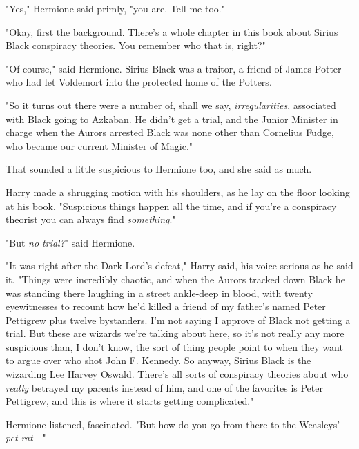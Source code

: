 "Yes," Hermione said primly, "you are. Tell me too."

"Okay, first the background. There's a whole chapter in this book about Sirius
Black conspiracy theories. You remember who that is, right?"

"Of course," said Hermione. Sirius Black was a traitor, a friend of James
Potter who had let Voldemort into the protected home of the Potters.

"So it turns out there were a number of, shall we say, \emph{irregularities},
associated with Black going to Azkaban. He didn't get a trial, and the Junior
Minister in charge when the Aurors arrested Black was none other than Cornelius
Fudge, who became our current Minister of Magic."

That sounded a little suspicious to Hermione too, and she said as much.

Harry made a shrugging motion with his shoulders, as he lay on the floor
looking at his book. "Suspicious things happen all the time, and if you're a
conspiracy theorist you can always find \emph{something}."

"But \emph{no trial?}" said Hermione.

"It was right after the Dark Lord's defeat," Harry said, his voice serious as
he said it. "Things were incredibly chaotic, and when the Aurors tracked down
Black he was standing there laughing in a street ankle-deep in blood, with
twenty eyewitnesses to recount how he'd killed a friend of my father's named
Peter Pettigrew plus twelve bystanders. I'm not saying I approve of Black not
getting a trial. But these are wizards we're talking about here, so it's not
really any more suspicious than, I don't know, the sort of thing people point
to when they want to argue over who shot John F. Kennedy. So anyway, Sirius
Black is the wizarding Lee Harvey Oswald. There's all sorts of conspiracy
theories about who \emph{really} betrayed my parents instead of him, and one of
the favorites is Peter Pettigrew, and this is where it starts getting
complicated."

Hermione listened, fascinated. "But how do you go from there to the Weasleys'
\emph{pet rat}—"

